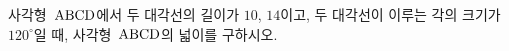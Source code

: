 사각형~$\mathrm{ABCD}$에서 두 대각선의 길이가 $10$, $14$이고, 두 대각선이 이루는 각의 크기가 $120^\circ$일 때, 사각형~$\mathrm{ABCD}$의 넓이를 구하시오.
